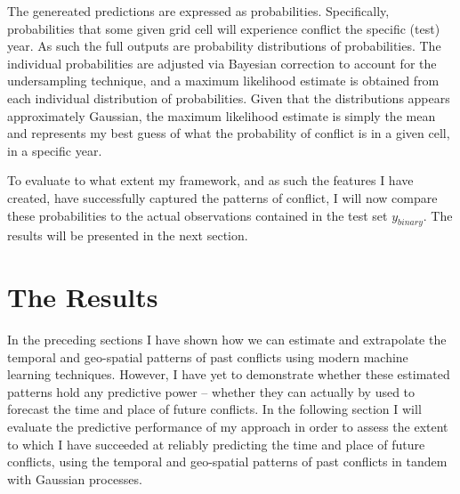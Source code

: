 \documentclass[a4paper]{article}
\begin{document}



The genereated predictions are expressed as probabilities. Specifically, probabilities that some given grid cell will experience conflict the specific (test) year. As such the full outputs are probability distributions of probabilities. The individual probabilities are adjusted via Bayesian correction to account for the undersampling technique, and a maximum likelihood estimate is obtained from each individual distribution of probabilities. Given that the distributions appears approximately Gaussian, the maximum likelihood estimate is simply the mean and represents my best guess of what the probability of conflict is in a given cell, in a specific year.\par 

To evaluate to what extent my framework, and as such the features I have created, have successfully captured the patterns of conflict, I will now compare these probabilities to the actual observations contained in the test set $y_{binary}$. The results will be presented in the next section.\par

\section{The Results}

In the preceding sections I have shown how we can estimate and extrapolate the temporal and geo-spatial patterns of past conflicts using modern machine learning techniques. However, I have yet to demonstrate whether these estimated patterns hold any predictive power -- whether they can actually by used to forecast the time and place of future conflicts. In the following section I will evaluate the predictive performance of my approach in order to assess the extent to which I have succeeded at reliably predicting the time and place of future conflicts, using the temporal and geo-spatial patterns of past conflicts in tandem with Gaussian processes.\par
\end{document}
